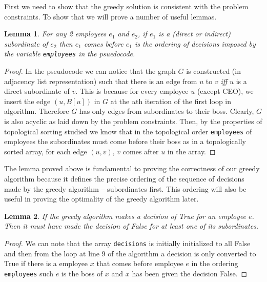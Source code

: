 \documentclass[answers]{exam}
\newtheorem{lemma}{Lemma}
\begin{document}
\begin{questions}
\begin{solution}
First we need to show that the greedy solution is consistent with the problem constraints. To show that we will prove a number of useful lemmas.

\begin{lemma}
For any 2 employees $e_1$ and $e_2$, if $e_1$ is a (direct or indirect) subordinate of $e_2$ then $e_1$ comes before $e_1$ is the ordering of decisions imposed by the variable \texttt{employees} in the psuedocode.
\end{lemma}
\begin{proof}
    In the pseudocode we can notice that the graph $G$ is constructed (in adjacency list representation) such that there is an edge from $u$ to $v$ \emph{iff} $u$ is a direct subordinate of $v$. This is because for every employee $u$ (except CEO), we insert the edge $(u,B[u])$ in $G$ at the $u$th iteration of the first loop in algorithm. Therefore $G$ has only edges from subordinates to their boss. Clearly, $G$ is also acyclic as laid down by the problem constraints. Then, by the properties of topological sorting studied we know that in the topological order \texttt{employees} of employees the subordinates must come before their boss as in a topologically sorted array, for each edge $(u, v)$, $v$ comes after $u$ in the array.
\end{proof}
The lemma proved above is fundamental to proving the correctness of our greedy algorithm because it defines the precise ordering of the sequence of decisions made by the greedy algorithm -- subordinates first. This ordering will also be useful in proving the optimality of the greedy algorithm later.

\begin{lemma}
If the greedy algorithm makes a decision of True for an employee $e$. Then it must have made the decision of False for at least one of its subordinates.
\end{lemma}
\begin{proof}
We can note that the array \texttt{decisions} is initially initialized to all False and then from the loop at line 9 of the algorithm a decision is only converted to True if there is a employee $x$ that comes before employee $e$ in the ordering \texttt{employees} such $e$ is the boss of $x$ and $x$ has been given the decision False.
\end{proof}


\end{solution}
\end{questions}
\end{document}
